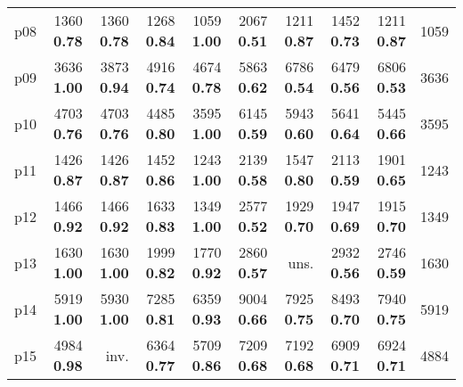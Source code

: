 \begin{tabular}{|l|rrrrrrrr|r|}
p08 & {\footnotesize 1360} \textbf{0.78} & {\footnotesize 1360} \textbf{0.78} & {\footnotesize 1268} \textbf{0.84} & {\footnotesize 1059} \textbf{1.00} & {\footnotesize 2067} \textbf{0.51} & {\footnotesize 1211} \textbf{0.87} & {\footnotesize 1452} \textbf{0.73} & {\footnotesize 1211} \textbf{0.87} & 1059\\
p09 & {\footnotesize 3636} \textbf{1.00} & {\footnotesize 3873} \textbf{0.94} & {\footnotesize 4916} \textbf{0.74} & {\footnotesize 4674} \textbf{0.78} & {\footnotesize 5863} \textbf{0.62} & {\footnotesize 6786} \textbf{0.54} & {\footnotesize 6479} \textbf{0.56} & {\footnotesize 6806} \textbf{0.53} & 3636\\
p10 & {\footnotesize 4703} \textbf{0.76} & {\footnotesize 4703} \textbf{0.76} & {\footnotesize 4485} \textbf{0.80} & {\footnotesize 3595} \textbf{1.00} & {\footnotesize 6145} \textbf{0.59} & {\footnotesize 5943} \textbf{0.60} & {\footnotesize 5641} \textbf{0.64} & {\footnotesize 5445} \textbf{0.66} & 3595\\
p11 & {\footnotesize 1426} \textbf{0.87} & {\footnotesize 1426} \textbf{0.87} & {\footnotesize 1452} \textbf{0.86} & {\footnotesize 1243} \textbf{1.00} & {\footnotesize 2139} \textbf{0.58} & {\footnotesize 1547} \textbf{0.80} & {\footnotesize 2113} \textbf{0.59} & {\footnotesize 1901} \textbf{0.65} & 1243\\
p12 & {\footnotesize 1466} \textbf{0.92} & {\footnotesize 1466} \textbf{0.92} & {\footnotesize 1633} \textbf{0.83} & {\footnotesize 1349} \textbf{1.00} & {\footnotesize 2577} \textbf{0.52} & {\footnotesize 1929} \textbf{0.70} & {\footnotesize 1947} \textbf{0.69} & {\footnotesize 1915} \textbf{0.70} & 1349\\
p13 & {\footnotesize 1630} \textbf{1.00} & {\footnotesize 1630} \textbf{1.00} & {\footnotesize 1999} \textbf{0.82} & {\footnotesize 1770} \textbf{0.92} & {\footnotesize 2860} \textbf{0.57} & uns. & {\footnotesize 2932} \textbf{0.56} & {\footnotesize 2746} \textbf{0.59} & 1630\\
p14 & {\footnotesize 5919} \textbf{1.00} & {\footnotesize 5930} \textbf{1.00} & {\footnotesize 7285} \textbf{0.81} & {\footnotesize 6359} \textbf{0.93} & {\footnotesize 9004} \textbf{0.66} & {\footnotesize 7925} \textbf{0.75} & {\footnotesize 8493} \textbf{0.70} & {\footnotesize 7940} \textbf{0.75} & 5919\\
p15 & {\footnotesize 4984} \textbf{0.98} & inv. & {\footnotesize 6364} \textbf{0.77} & {\footnotesize 5709} \textbf{0.86} & {\footnotesize 7209} \textbf{0.68} & {\footnotesize 7192} \textbf{0.68} & {\footnotesize 6909} \textbf{0.71} & {\footnotesize 6924} \textbf{0.71} & 4884\\

\end{tabular}
